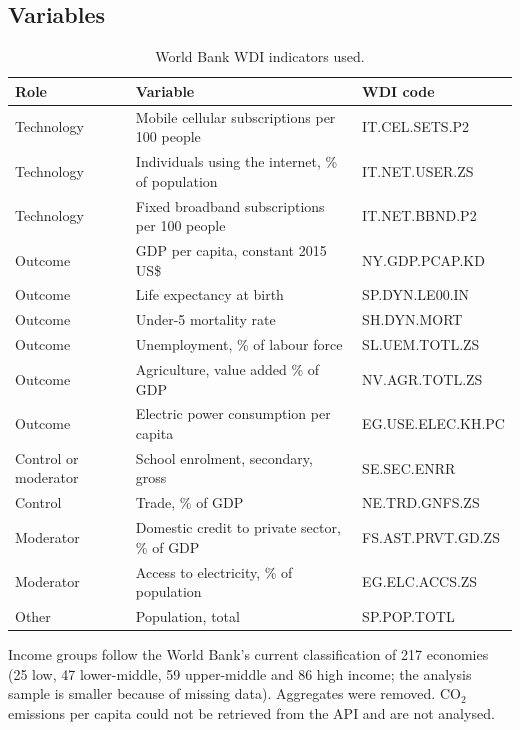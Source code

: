 \subsection*{Variables}
\begin{table}[!ht]\centering\footnotesize\caption{World Bank WDI indicators used.}\label{tab:wdi}\begin{tabular}{@{}lll@{}}\toprule Role & Variable & WDI code\\\midrule
Technology & Mobile cellular subscriptions per 100 people & IT.CEL.SETS.P2\\
Technology & Individuals using the internet, \% of population & IT.NET.USER.ZS\\
Technology & Fixed broadband subscriptions per 100 people & IT.NET.BBND.P2\\
Outcome & GDP per capita, constant 2015 US\$ & NY.GDP.PCAP.KD\\
Outcome & Life expectancy at birth & SP.DYN.LE00.IN\\
Outcome & Under-5 mortality rate & SH.DYN.MORT\\
Outcome & Unemployment, \% of labour force & SL.UEM.TOTL.ZS\\
Outcome & Agriculture, value added \% of GDP & NV.AGR.TOTL.ZS\\
Outcome & Electric power consumption per capita & EG.USE.ELEC.KH.PC\\
Control or moderator & School enrolment, secondary, gross & SE.SEC.ENRR\\
Control & Trade, \% of GDP & NE.TRD.GNFS.ZS\\
Moderator & Domestic credit to private sector, \% of GDP & FS.AST.PRVT.GD.ZS\\
Moderator & Access to electricity, \% of population & EG.ELC.ACCS.ZS\\
Other & Population, total & SP.POP.TOTL\\
\bottomrule\end{tabular}\end{table}

Income groups follow the World Bank's current classification of 217 economies (25 low, 47 lower-middle, 59 upper-middle and 86 high income; the analysis sample is smaller because of missing data). Aggregates were removed. CO$_2$ emissions per capita could not be retrieved from the API and are not analysed.

